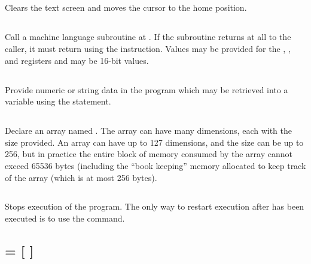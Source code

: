 \documentclass{article}
\begin{document}
    \subsection{}

    Clears the text screen and moves the cursor to the home position.

    \subsection{}

    Call a machine language subroutine at . If the subroutine returns at all to the caller, it
    must return using the  instruction. Values may be provided for the , , and
     registers and may be 16-bit values.

    \subsection{}

    Provide numeric or string data in the program which may be retrieved into a variable using the  statement.

    \subsection{}

    Declare an array named .
    The array can have many dimensions, each with the size provided.
    An array can have up to 127 dimensions, and the size can be up to 256, but in practice the entire block of memory
    consumed by the array cannot exceed 65536 bytes (including the ``book keeping'' memory allocated to keep track of the array
    (which is at most 256 bytes).

    \subsection{}

    Stops execution of the program. The only way to restart execution after  has been
    executed is to use the  command.

    \subsection{  =    [ ]}
\end{document}
